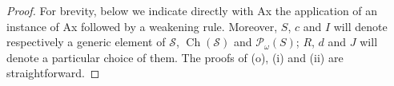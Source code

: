 \documentclass{article}
\theoremstyle{definition}
\DeclareMathOperator{\Ch}{Ch}
\begin{document}
\begin{proof} For brevity, below we indicate directly with Ax the application of an instance of Ax followed by a weakening rule. Moreover, $S$, $c$ and $I$ will denote respectively a generic element of $\mathscr{S}$, $\Ch(\mathscr{S})$ and
$\mathcal{P}_\omega(S)$;
%
$R$, $d$ and $J$ will denote a particular choice of them. The proofs of (o), (i) and (ii) are straightforward.

\end{proof}
\end{document}
